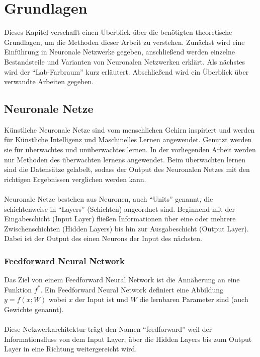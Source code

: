 \chapter{Grundlagen}
Dieses Kapitel verschafft einen Überblick über die benötigten theoretische Grundlagen, um die Methoden dieser Arbeit zu verstehen. 
Zunächst wird eine Einführung in Neuronale Netzwerke gegeben, anschließend werden
einzelne Bestandsteile und Varianten von Neuronalen Netzwerken erklärt. 
Als nächstes wird der ``Lab-Farbraum'' kurz erläutert. Abschließend wird ein Überblick über verwandte Arbeiten gegeben.

\section{Neuronale Netze}
Künstliche Neuronale Netze sind vom menschlichen Gehirn inspiriert und werden für Künstliche Intelligenz und Maschinelles Lernen
angewendet. Genutzt werden sie für überwachtes und unüberwachtes lernen. In der vorliegenden Arbeit werden nur Methoden des überwachten
lernens angewendet. Beim überwachten lernen sind die Datensätze gelabelt, sodass der Output des Neuronalen Netzes mit den richtigen Ergebnissen
verglichen werden kann.
\\
\\
Neuronale Netze bestehen aus Neuronen, auch ``Units'' genannt, die schichtenweise in ``Layers'' (Schichten) angeordnet sind.
Beginnend mit der Eingabeschicht (Input \gls{Layer}) fließen Informationen über eine oder mehrere Zwischenschichten (Hidden \gls{Layer}s) bis hin zur 
Ausgabeschicht (Output \gls{Layer}). Dabei ist der Output des einen Neurons der Input des nächsten. \cite{neuronale-netze-aufbau}

\subsection{Feedforward Neural Network}
Das Ziel von einem Feedforward Neural Network ist die Annäherung an eine Funktion $ f^* $. Ein Feedforward Neural Network definiert 
eine Abbildung $ y = f(x;W) $ wobei $ x $ der Input ist und $ W $ die lernbaren Parameter sind (auch Gewichte genannt).
\cite[164-223]{Goodfellow-et-al-2016}
\\
\\
Diese Netzwerkarchitektur trägt den Namen ``feedforward'' weil der Informationsfluss von dem Input \gls{Layer},
über die Hidden Layers bis zum Output \gls{Layer} in eine Richtung weitergereicht wird.

